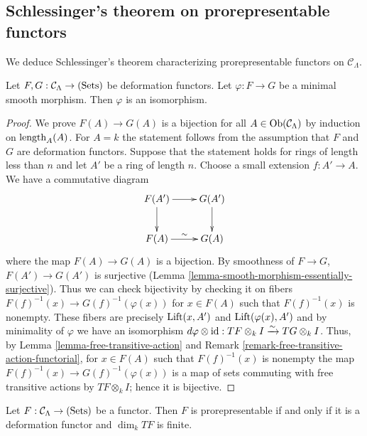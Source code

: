 \subsection{Schlessinger's theorem on prorepresentable functors}
We deduce Schlessinger's theorem characterizing prorepresentable functors on 
$\mathcal C_{\Lambda}$.

\begin{lemma}
\label{lemma-minimal-smooth-morphism-functors}
Let $F,G: \mathcal C_{\Lambda} \rightarrow \textnormal{(Sets)}$ be deformation 
functors.  Let $\varphi: F \rightarrow G$ be a minimal smooth morphism. Then 
$\varphi$ is an isomorphism.
\end{lemma}

\begin{proof}
We prove $F(A) \rightarrow G(A)$ is a bijection for all $A \in 
\textnormal{Ob}(\mathcal C_{\Lambda})$ by induction on 
$\textnormal{length}_{A}(A)$.  For $A = k$ the statement follows from the 
assumption that $F$ and $G$ are deformation functors. Suppose that the 
statement holds for rings of length less than $n$ and let $A'$ be a ring of 
length $n$. Choose a small extension $f: A' \rightarrow A$.  We have a 
commutative diagram
\[
\xymatrix{
F(A') \ar[r] \ar[d] & G(A') \ar[d] \\
F(A) \ar[r]^{\sim} & G(A)
}
\]
where the map $F(A) \rightarrow G(A)$ is a bijection.  By smoothness of $F 
\rightarrow G$, $F(A') \rightarrow G(A')$ is surjective (Lemma 
\ref{lemma-smooth-morphism-essentially-surjective}).  Thus we can check 
bijectivity by checking it on fibers $F(f)^{-1}(x) \rightarrow 
G(f)^{-1}(\varphi(x))$ for $x \in F(A)$ such that $F(f)^{-1}(x)$ is nonempty.  
These fibers are precisely $\textnormal{Lift}(x,A')$ and 
$\textnormal{Lift}(\varphi(x),A')$ and by minimality of $\varphi$ we have an 
isomorphism $d\varphi \otimes \textnormal{id}: TF \otimes_{k} I 
\xrightarrow{\sim} TG \otimes_{k} I$.  Thus, by Lemma 
\ref{lemma-free-transitive-action} and Remark 
\ref{remark-free-transitive-action-functorial}, for $x \in F(A)$ such that 
$F(f)^{-1}(x)$ is nonempty the map $F(f)^{-1}(x) \rightarrow 
G(f)^{-1}(\varphi(x))$ is a map of sets commuting with free transitive actions 
by $TF \otimes_{k} I$; hence it is bijective.
\end{proof}

\begin{theorem}
\label{lemma-Schlessinger-prorepresentability}
Let $F: \mathcal C_{\Lambda} \rightarrow \textnormal{(Sets)}$ be a functor.  
Then $F$ is prorepresentable if and only if it is a deformation functor and 
$\dim_k TF$ is finite.
\end{theorem}

